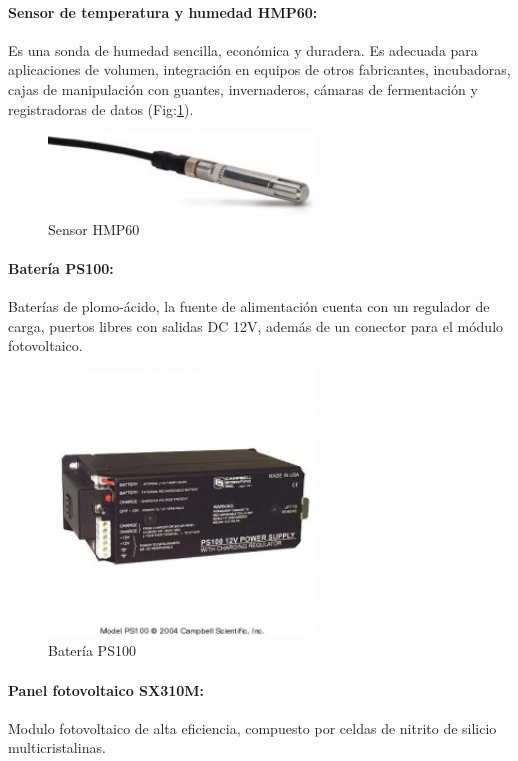 \paragraph{Sensor de temperatura y humedad HMP60:}
Es una sonda de humedad sencilla, económica y duradera. Es adecuada para aplicaciones de volumen, integración en equipos de otros fabricantes, incubadoras, cajas de manipulación con guantes, invernaderos, cámaras de fermentación y registradoras de datos (Fig:\ref{hr}).

\begin{figure}[h!]
        \centering
        \includegraphics[width=200pt]{images/SensorThmp60}
        \caption{Sensor HMP60}
	\label{hr}
\end{figure}

\paragraph{Batería PS100:}
Baterías de plomo-ácido, la fuente de alimentación cuenta con un regulador de carga, puertos libres con salidas DC 12V, además de un conector para el módulo fotovoltaico.

\begin{figure}[h!]
        \centering
        \includegraphics[width=200pt]{images/bateria}
        \caption{Batería PS100} 
\end{figure}

\paragraph{Panel fotovoltaico SX310M:}
Modulo fotovoltaico de alta eficiencia, compuesto por celdas de nitrito de silicio multicristalinas.

